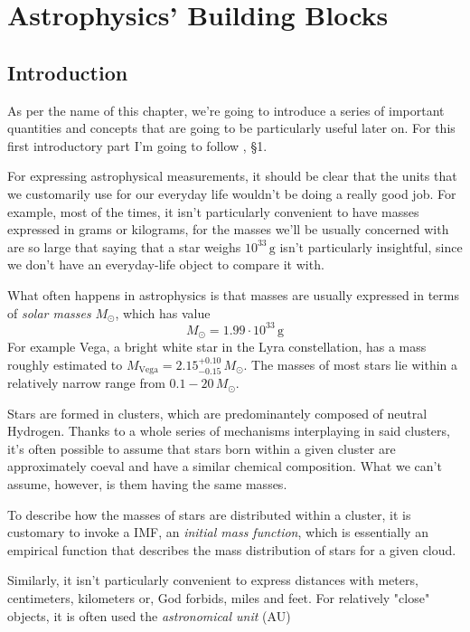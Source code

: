 
\chapter{Astrophysics' Building Blocks}\label{ch:i}

\section{Introduction}
As per the name of this chapter, we're going to introduce a series of important quantities and concepts that are going to be particularly useful later on. For this first introductory part I'm going to follow \cite{choudhuri}, §1.
\par For expressing astrophysical measurements, it should be clear that the units that we customarily use for our everyday life wouldn't be doing a really good job. For example, most of the times, it isn't particularly convenient to have masses expressed in grams or kilograms, for the masses we'll be usually concerned with are so large that saying that a star weighs $10^{33}\,\text{g}$ isn't particularly insightful, since we don't have an everyday-life object to compare it with.
\par What often happens in astrophysics is that masses are usually expressed in terms of \emph{solar masses} $M_{\odot}$, which has value
\begin{equation}
    M_{\odot} = 1.99 \cdot 10^{33}\,\text{g}
    \label{eq:solarmass}
\end{equation}
For example Vega, a bright white star in the Lyra constellation, has a mass roughly estimated to $M_{\text{Vega}} = 2.15^{+0.10}_{-0.15}\, M_{\odot}$. The masses of most stars lie within a relatively narrow range from $0.1-20\,M_{\odot}$.
\par Stars are formed in clusters, which are predominantely composed of neutral Hydrogen. Thanks to a whole series of mechanisms interplaying in said clusters, it's often possible to assume that stars born within a given cluster are approximately coeval and have a similar chemical composition. What we can't assume, however, is them having the same masses.
\par To describe how the masses of stars are distributed within a cluster, it is customary to invoke a IMF, an \emph{initial mass function}, which is essentially an empirical function that describes the mass distribution of stars for a given cloud.
\par Similarly, it isn't particularly convenient to express distances with meters, centimeters, kilometers or, God forbids, miles and feet. For relatively "close" objects, it is often used the \emph{astronomical unit} (AU)
